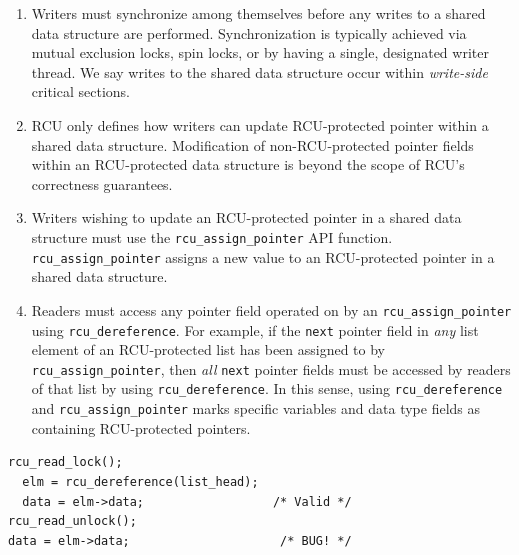 \documentclass[preprint]{sigplanconf}
\begin{document}
\begin{enumerate}
	\item Writers must synchronize among themselves before any writes to a shared data structure are performed. Synchronization is typically achieved via mutual exclusion locks, spin locks, or by having a single, designated writer thread. We say writes to the shared data structure occur within \emph{write-side} critical sections.

	\item RCU only defines how writers can update RCU-protected pointer within a shared data structure. Modification of non-RCU-protected pointer fields within an RCU-protected data structure is beyond the scope of RCU's correctness guarantees.

	\item Writers wishing to update an RCU-protected pointer in a shared data structure must use the \texttt{rcu\_assign\_pointer} API function. \texttt{rcu\_assign\_pointer} assigns a new value to an RCU-protected pointer in a shared data structure.

	\item Readers must access any pointer field operated on by an \texttt{rcu\_\linebreak[0]assign\_pointer} using \texttt{rcu\_\linebreak[0]dereference}. For example, if the \texttt{next} pointer field in \emph{any} list element of an RCU-protected list has been assigned to by \texttt{rcu\_assign\_\linebreak[0]pointer}, then \emph{all} \texttt{next} pointer fields must be accessed by readers of that list by using \texttt{rcu\_\linebreak[0]dereference}. In this sense, using \texttt{rcu\_\linebreak[0]dereference} and \texttt{rcu\_assign\_\linebreak[0]pointer} marks specific variables and data type fields as containing RCU-protected pointers.

\end{enumerate}

%


\newsavebox\rcuexistencebug
\begin{lrbox}{\rcuexistencebug}
\begin{lstlisting}[basicstyle=\scriptsize\ttfamily]
rcu_read_lock();
  elm = rcu_dereference(list_head);
  data = elm->data;                  /* Valid */
rcu_read_unlock();
data = elm->data;                     /* BUG! */
\end{lstlisting}
\end{lrbox}
\end{document}
